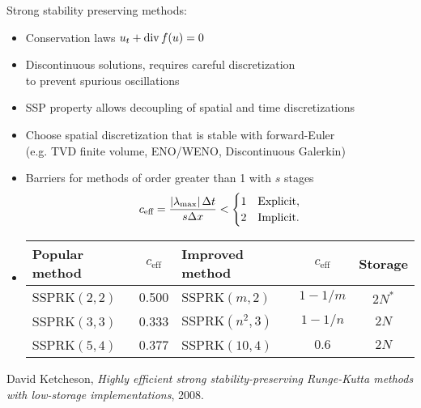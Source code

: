 \begin{frame}{Strong stability preserving methods: }
  \begin{itemize}
  \item Conservation laws $u_t + \operatorname{div} f(u) = 0$
  \item Discontinuous solutions, requires careful discretization \\
    to prevent spurious oscillations
  \item SSP property allows decoupling of spatial and time discretizations
  \item Choose spatial discretization that is stable with forward-Euler \\
    (e.g. TVD finite volume, ENO/WENO, Discontinuous Galerkin)
  \item Barriers for methods of order greater than 1 with $s$ stages
    \begin{equation*}
    c_{\text{eff}} = \frac{\left\lvert \lambda_{\text{max}} \right\rvert\Delta t}{s\Delta x} <
    \begin{cases}
      1 & \text{Explicit}, \\
      2 & \text{Implicit}.
    \end{cases}
  \end{equation*}
  \item
    \begin{centering}
      \begin{tabular}{|l|c|l|c|c|}
        \hline
        Popular method & $c_{\text{eff}}$ & Improved method & $c_{\text{eff}}$ & Storage \\
        \hline
        SSPRK$(2,2)$ & 0.500 & SSPRK$(m,2)$ & $1-1/m$ & $2N^*$ \\
        SSPRK$(3,3)$ & 0.333 & SSPRK$(n^2,3)$ & $1-1/n$ & $2N$ \\
        SSPRK$(5,4)$ & 0.377 & SSPRK$(10,4)$ & $0.6$ & $2N$ \\
        \hline
      \end{tabular}
    \end{centering}
  \end{itemize}
  {\small David Ketcheson, \emph{Highly efficient strong stability-preserving Runge-Kutta methods with low-storage implementations}, 2008.}
\end{frame}
